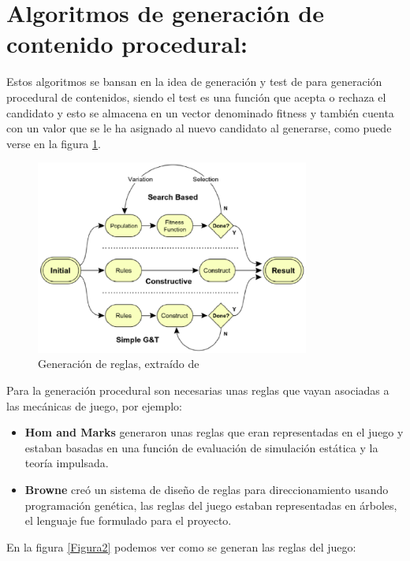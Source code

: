\section{Algoritmos de generación de contenido procedural:}

Estos algoritmos se bansan en la idea de generación y test de para generación procedural de contenidos, siendo el test es una función que acepta o rechaza el candidato y esto se almacena en un vector denominado fitness y también cuenta con un valor que se le ha asignado al nuevo candidato  al generarse, como puede verse en la figura \ref{Figura1}.\cite{B3}

\begin{figure}[h!]

	\centering
	\includegraphics[width=9cm]{./eps/fig1.eps}
	\caption{Generación de reglas, extraído de \cite{B3}}
	\label{Figura1}

\end{figure}


Para la generación procedural son necesarias unas reglas que vayan asociadas a las mecánicas de juego, por ejemplo:\cite{B3}
\begin{itemize}
\item{\bf Hom and Marks} generaron unas reglas que eran representadas en el juego y estaban basadas en una función de evaluación de simulación estática y la teoría impulsada.

\item{\bf Browne} creó un sistema de diseño de reglas para direccionamiento usando programación genética, las reglas del juego estaban representadas en árboles, el lenguaje fue formulado para el proyecto.

\end{itemize}

\newpage
En la figura \ref{Figura2} podemos ver como se generan las reglas del juego:

